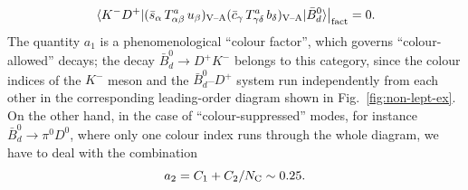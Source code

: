 \documentclass[11pt]{cernrep}
\begin{document}
\begin{equation}
\left.\langle K^-D^+|
(\bar s_\alpha\, T^a_{\alpha\beta}\,u_\beta)_{\mbox{{\scriptsize 
V--A}}}(\bar c_\gamma 
\,T^a_{\gamma\delta}\,b_\delta)_{\mbox{{\scriptsize V--A}}}
|\bar B^0_d\rangle\right|_{\rm fact}=0.
\end{equation}
The quantity $a_1$ is a phenomenological ``colour factor'', 
which governs ``colour-allowed'' decays; the
decay $\bar B^0_d\to D^+K^-$ belongs to this category, since the 
colour indices of the $K^-$ meson and the $\bar B^0_d$--$D^+$ system 
run independently from each other in the corresponding leading-order 
diagram shown in Fig.~\ref{fig:non-lept-ex}. On the other hand, in the case 
of ``colour-suppressed'' modes, for instance $\bar B^0_d\to \pi^0D^0$, where only 
one colour index runs through the whole diagram, we have to deal with the combination
\begin{equation}\label{a2-def}
a_2=C_1+C_2/N_{\rm C}\sim0.25.
\end{equation}
\end{document}
